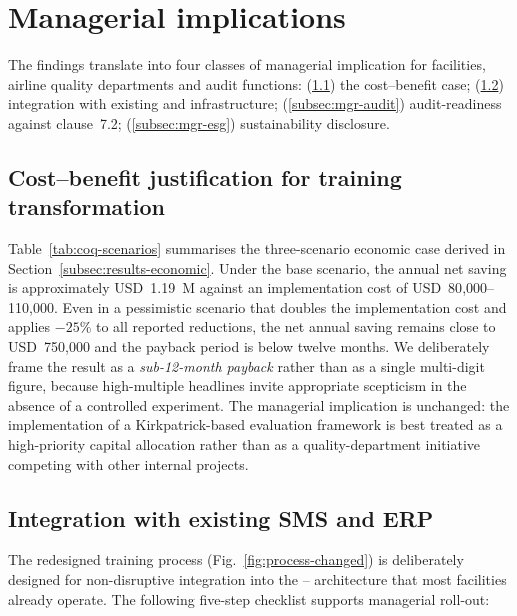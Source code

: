 \section{Managerial implications}
\label{sec:managerial}

The findings translate into four classes of managerial implication for
\MRO{} facilities, airline quality departments and audit functions:
(\ref{subsec:mgr-costbenefit}) the cost--benefit case;
(\ref{subsec:mgr-integration}) integration with existing \SMS{} and \ERP{}
infrastructure;
(\ref{subsec:mgr-audit}) audit-readiness against \AS{} clause~7.2;
(\ref{subsec:mgr-esg}) sustainability disclosure.

\subsection{Cost--benefit justification for training transformation}
\label{subsec:mgr-costbenefit}

Table~\ref{tab:coq-scenarios} summarises the three-scenario economic case
derived in Section~\ref{subsec:results-economic}. Under the base scenario,
the annual net saving is approximately USD~1.19~M against an
implementation cost of USD~80{,}000--110{,}000. Even in a pessimistic
scenario that doubles the implementation cost and applies $-25\%$ to all
reported reductions, the net annual saving remains close to
USD~750{,}000 and the payback period is below twelve months. We
deliberately frame the result as a \emph{sub-12-month payback} rather
than as a single multi-digit \ROI{} figure, because high-multiple \ROI{}
headlines invite appropriate scepticism in the absence of a controlled
experiment. The managerial implication is unchanged: the implementation
of a Kirkpatrick-based evaluation framework is best treated as a
high-priority capital allocation rather than as a quality-department
initiative competing with other internal projects.

\subsection{Integration with existing SMS and ERP}
\label{subsec:mgr-integration}

The redesigned training process (Fig.~\ref{fig:process-changed}) is
deliberately designed for non-disruptive integration into the
\LMS{}--\ERP{} architecture that most \MRO{} facilities already operate.
The following five-step checklist supports managerial roll-out:

